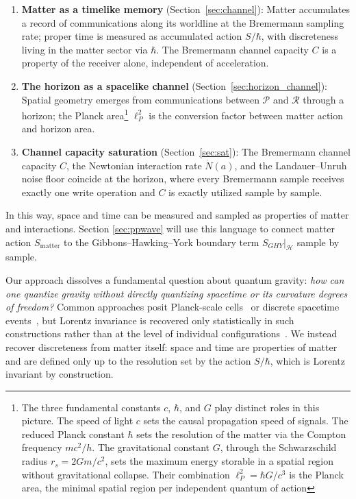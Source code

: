 \documentclass[12pt,a4paper]{article}
\begin{document}
\begin{enumerate}
    \item \textbf{Matter as a timelike memory} 
      (Section~\ref{sec:channel}): Matter accumulates 
      a record of communications along its worldline 
      at the Bremermann sampling rate; proper time is 
      measured as accumulated action $S/\hbar$, with 
      discreteness living in the matter sector via 
      $\hbar$. The Bremermann channel capacity $C$ is 
      a property of the receiver alone, independent 
      of acceleration.
    \item \textbf{The horizon as a spacelike channel} 
      (Section~\ref{sec:horizon_channel}): Spatial 
      geometry emerges from communications between 
      $\mathcal{P}$ and $\mathcal{R}$ through a 
      horizon; the Planck area\footnote{The three fundamental 
constants $c$, $\hbar$, and $G$ play distinct roles 
in this picture. The speed of light $c$ sets the 
causal propagation speed of signals. The reduced 
Planck constant $\hbar$ sets the resolution of the 
matter via the Compton frequency $mc^2/h$. 
The gravitational constant $G$, through the 
Schwarzschild radius $r_s = 2Gm/c^2$, sets the 
maximum energy storable in a spatial region without 
gravitational collapse. Their combination 
$\ell_P^2 = \hbar G/c^3$ is the Planck area, the 
minimal spatial region per independent quantum of 
action} $\ell_P^2$ is the 
      conversion factor between matter action and 
      horizon area.
    \item \textbf{Channel capacity saturation} 
      (Section~\ref{sec:sat}): The Bremermann channel 
      capacity $C$, the Newtonian interaction rate 
      $\dot{N}(a)$, and the Landauer--Unruh noise 
      floor coincide at the horizon, where every 
      Bremermann sample receives exactly one write 
      operation and $C$ is exactly utilized sample 
      by sample.
\end{enumerate}
In this way, space and time can be measured and sampled as properties of matter and interactions. Section \ref{sec:ppwave} will use this language to connect matter action $S_{\mathrm{matter}}$  to the Gibbons--Hawking--York boundary term $S_{GHY}|_{\mathcal{H}}$ sample by sample.

Our approach dissolves a fundamental question about quantum 
gravity: {\it how can one quantize gravity without directly 
quantizing spacetime or its curvature degrees of freedom?} 
Common approaches posit Planck-scale 
cells~\cite{wheeler1955geons} or discrete spacetime 
events~\cite{bombelli1987space}, but Lorentz invariance 
is recovered only statistically in such constructions 
rather than at the level of individual 
configurations~\cite{brown_mathpages_unruh}. We instead 
recover discreteness from matter itself: space and time are 
properties of matter and are defined only up to the 
resolution set by the action $S/\hbar$, which is Lorentz 
invariant by construction.
\end{document}
